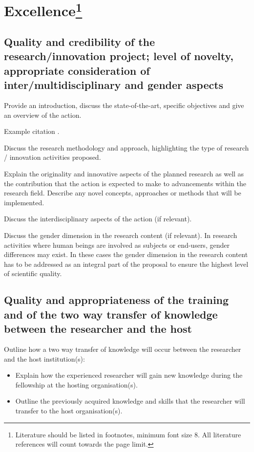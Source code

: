
\markStartPageLimit
\section{Excellence\footnote{Literature should be listed in footnotes, minimum font size 8. All literature references will count towards the page limit.}}
\label{sec:excellence}


\subsection{Quality and credibility of the research/innovation project; level of novelty, appropriate consideration of inter/multidisciplinary and gender aspects}
\label{sec:excellence_quality}

Provide an introduction, discuss the state-of-the-art, specific objectives and give an
overview of the action.

Example citation \cite{Gomes2018}.

\medskip\noindent
Discuss the research methodology and approach, highlighting the type of research /
innovation activities proposed.

\medskip\noindent
Explain the originality and innovative aspects of the planned research as well as the
contribution that the action is expected to make to advancements within the research
field. Describe any novel concepts, approaches or methods that will be implemented.

\medskip\noindent
Discuss the interdisciplinary aspects of the action (if relevant).

\medskip\noindent
Discuss the gender dimension in the research content (if relevant). In research activities
where human beings are involved as subjects or end-users, gender differences may
exist. In these cases the gender dimension in the research content has to be addressed
as an integral part of the proposal to ensure the highest level of scientific quality.


\subsection{Quality and appropriateness of the training and of the two way transfer of knowledge between the researcher and the host}
\label{sec:excellence_transfer}

Outline how a two way transfer of knowledge will occur between the researcher and the host institution(s):
\begin{itemize}
\item Explain how the experienced researcher will gain new knowledge during the fellowship at the hosting organisation(s).
\item Outline the previously acquired knowledge and skills that the researcher will transfer to the host organisation(s).
\end{itemize}

